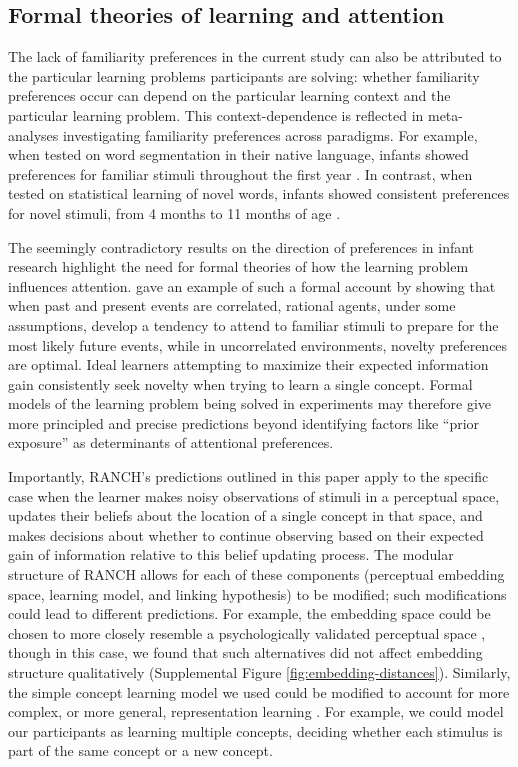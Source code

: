 \documentclass[
]{article}
\begin{document}
\hypertarget{formal-theories-of-learning-and-attention}{%
\subsection{Formal theories of learning and attention}\label{formal-theories-of-learning-and-attention}}

The lack of familiarity preferences in the current study can also be attributed to the particular learning problems participants are solving: whether familiarity preferences occur can depend on the particular learning context and the particular learning problem. This context-dependence is reflected in meta-analyses investigating familiarity preferences across paradigms. For example, when tested on word segmentation in their native language, infants showed preferences for familiar stimuli throughout the first year \autocite{bergmann2016development}. In contrast, when tested on statistical learning of novel words, infants showed consistent preferences for novel stimuli, from 4 months to 11 months of age \autocite{black2017quantifying}.

The seemingly contradictory results on the direction of preferences in infant research highlight the need for formal theories of how the learning problem influences attention. \textcite{dubey2020reconciling} gave an example of such a formal account by showing that when past and present events are correlated, rational agents, under some assumptions, develop a tendency to attend to familiar stimuli to prepare for the most likely future events, while in uncorrelated environments, novelty preferences are optimal. Ideal learners attempting to maximize their expected information gain consistently seek novelty when trying to learn a single concept. Formal models of the learning problem being solved in experiments may therefore give more principled and precise predictions beyond identifying factors like ``prior exposure'' as determinants of attentional preferences.

Importantly, RANCH's predictions outlined in this paper apply to the specific case when the learner makes noisy observations of stimuli in a perceptual space, updates their beliefs about the location of a single concept in that space, and makes decisions about whether to continue observing based on their expected gain of information relative to this belief updating process. The modular structure of RANCH allows for each of these components (perceptual embedding space, learning model, and linking hypothesis) to be modified; such modifications could  lead to different predictions. For example, the embedding space could be chosen to more closely resemble a psychologically validated perceptual space \autocite[e.g.][]{lee2022rapid}, though in this case, we found that such alternatives did not affect embedding structure qualitatively (Supplemental Figure \ref{fig:embedding-distances}). Similarly, the simple concept learning model we used could be modified to account for more complex, or more general, representation learning \autocite{kemp2008discovery,tenenbaum2011grow}. For example, we could model our participants as learning multiple concepts, deciding whether each stimulus is part of the same concept or a new concept.
\end{document}
